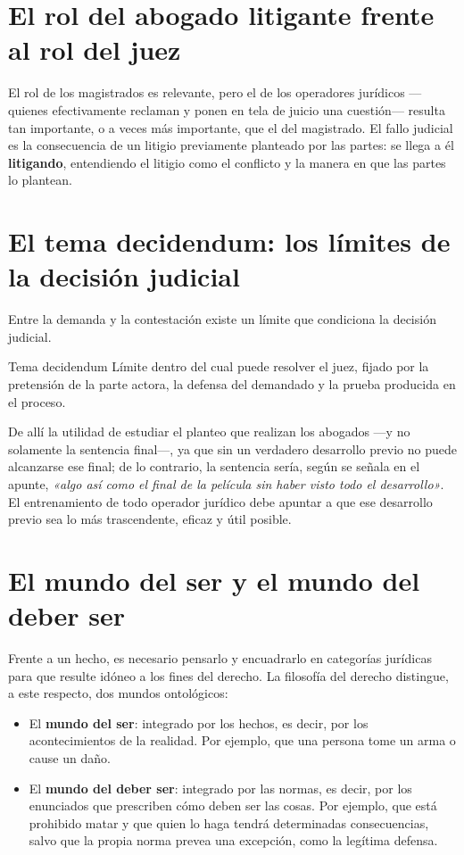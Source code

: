 \documentclass[12pt,oneside]{book}
\begin{document}
\section{El rol del abogado litigante frente al rol del juez}

El rol de los magistrados es relevante, pero el de los operadores jurídicos —quienes efectivamente reclaman y ponen en tela de juicio una cuestión— resulta tan importante, o a veces más importante, que el del magistrado. El fallo judicial es la consecuencia de un litigio previamente planteado por las partes: se llega a él \textbf{litigando}, entendiendo el litigio como el conflicto y la manera en que las partes lo plantean.

\section{El tema decidendum: los límites de la decisión judicial}

Entre la demanda y la contestación existe un límite que condiciona la decisión judicial.

\begin{definition}{Tema decidendum}
Límite dentro del cual puede resolver el juez, fijado por la pretensión de la parte actora, la defensa del demandado y la prueba producida en el proceso.
\end{definition}

De allí la utilidad de estudiar el planteo que realizan los abogados —y no solamente la sentencia final—, ya que sin un verdadero desarrollo previo no puede alcanzarse ese final; de lo contrario, la sentencia sería, según se señala en el apunte, \textit{«algo así como el final de la película sin haber visto todo el desarrollo»}. El entrenamiento de todo operador jurídico debe apuntar a que ese desarrollo previo sea lo más trascendente, eficaz y útil posible.

\section{El mundo del ser y el mundo del deber ser}

Frente a un hecho, es necesario pensarlo y encuadrarlo en categorías jurídicas para que resulte idóneo a los fines del derecho. La filosofía del derecho distingue, a este respecto, dos mundos ontológicos:

\begin{itemize}
    \item El \textbf{mundo del ser}: integrado por los hechos, es decir, por los acontecimientos de la realidad. Por ejemplo, que una persona tome un arma o cause un daño.
    \item El \textbf{mundo del deber ser}: integrado por las normas, es decir, por los enunciados que prescriben cómo deben ser las cosas. Por ejemplo, que está prohibido matar y que quien lo haga tendrá determinadas consecuencias, salvo que la propia norma prevea una excepción, como la legítima defensa.
\end{itemize}
\end{document}
